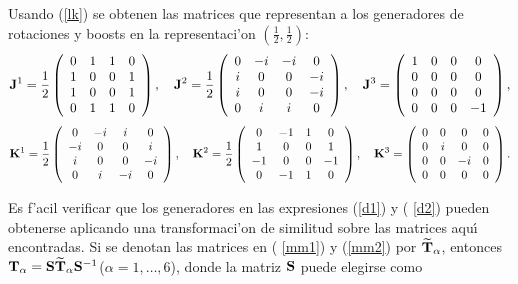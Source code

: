 Usando (\ref{lk}) se obtenen las matrices que representan a los generadores
de rotaciones y boosts en la representaci'on $(\frac{1}{2},\frac{1}{2})$: 
\begin{equation}
{\bf J}^1=\frac{1}{2}\left( 
\begin{array}{cccc}
0 & 1 & 1 & 0 \\ 
1 & 0 & 0 & 1 \\ 
1 & 0 & 0 & 1 \\ 
0 & 1 & 1 & 0
\end{array}
\right) ,\quad {\bf J}^2=\frac{1}{2}\left( 
\begin{array}{cccc}
0 & -i & -i & 0 \\ 
i & 0 & 0 & -i \\ 
i & 0 & 0 & -i \\ 
0 & i & i & 0
\end{array}
\right) ,\quad {\bf J}^3=\left( 
\begin{array}{cccc}
1 & 0 & 0 & 0 \\ 
0 & 0 & 0 & 0 \\ 
0 & 0 & 0 & 0 \\ 
0 & 0 & 0 & -1
\end{array}
\right) ,  \label{mm1}
\end{equation}
\begin{equation}
{\bf K}^1=\frac{1}{2}\left( 
\begin{array}{cccc}
0 & -i & i & 0 \\ 
-i & 0 & 0 & i \\ 
i & 0 & 0 & -i \\ 
0 & i & -i & 0
\end{array}
\right) ,\quad {\bf K}^2=\frac{1}{2}\left( 
\begin{array}{cccc}
0 & -1 & 1 & 0 \\ 
1 & 0 & 0 & 1 \\ 
-1 & 0 & 0 & -1 \\ 
0 & -1 & 1 & 0
\end{array}
\right) ,\quad {\bf K}^3=\left( 
\begin{array}{cccc}
0 & 0 & 0 & 0 \\ 
0 & i & 0 & 0 \\ 
0 & 0 & -i & 0 \\ 
0 & 0 & 0 & 0
\end{array}
\right) .  \label{mm2}
\end{equation}

Es f'acil verificar que los generadores en las expresiones (\ref{d1}) y (%
\ref{d2}) pueden obtenerse aplicando una transformaci'on de similitud
sobre las matrices aqu{\'{\i }} encontradas. Si se denotan las matrices en (%
\ref{mm1}) y (\ref{mm2}) por $\widetilde{{\bf T}}_{\alpha }$, entonces ${\bf %
T}_{\alpha }={\bf S}\widetilde{{\bf T}}_{\alpha }{\bf S}^{-1}$($\alpha
=1,\ldots ,6$), donde la matriz ${\bf S}$ puede elegirse como

